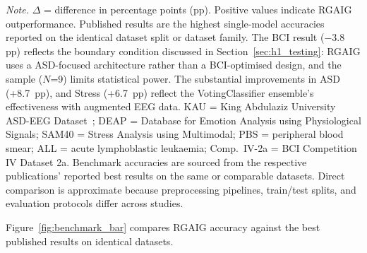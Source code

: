\begin{table}[!htbp]
\vspace{0.5em}\noindent\textit{Note.} $\Delta$ = difference in percentage points (pp). Positive values indicate RGAIG outperformance. Published results are the highest single-model accuracies reported on the identical dataset split or dataset family. The BCI result ($-$3.8 pp) reflects the boundary condition discussed in Section~\ref{sec:h1_testing}: RGAIG uses a ASD-focused architecture rather than a BCI-optimised design, and the sample ($N$=9) limits statistical power. The substantial improvements in ASD (+8.7~pp), and Stress (+6.7~pp) reflect the VotingClassifier ensemble's effectiveness with augmented EEG data. KAU = King Abdulaziz University ASD-EEG Dataset~\cite{djemal2017asd}; DEAP = Database for Emotion Analysis using Physiological Signals; SAM40 = Stress Analysis using Multimodal; PBS = peripheral blood smear; ALL = acute lymphoblastic leukaemia; Comp.\ IV-2a = BCI Competition IV Dataset 2a. Benchmark accuracies are sourced from the respective publications' reported best results on the same or comparable datasets. Direct comparison is approximate because preprocessing pipelines, train/test splits, and evaluation protocols differ across studies.
\end{table}
\fi %

\noindent Figure~\ref{fig:benchmark_bar} compares RGAIG accuracy against the best published results on identical datasets.

%
\fi

